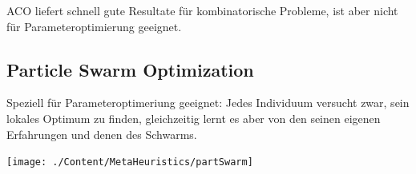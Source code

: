   ACO liefert schnell gute Resultate für kombinatorische Probleme, ist aber nicht für Parameteroptimierung geeignet.\\
  
%  
  
\subsection{Particle Swarm Optimization }
  Speziell für Parameteroptimeriung geeignet: Jedes Individuum versucht zwar, sein lokales Optimum zu finden, gleichzeitig lernt es aber von den seinen eigenen Erfahrungen und denen des Schwarms.
  
  \begin{center}
  \texttt{[image: ./Content/MetaHeuristics/partSwarm]}
  \end{center}

\newpage
  
%  
  

